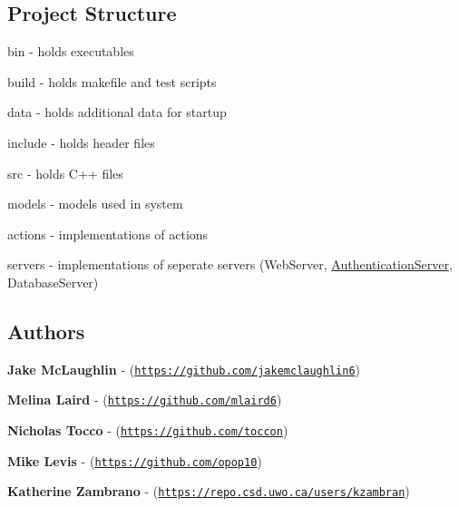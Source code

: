 \subsection*{Project Structure}


\begin{DoxyItemize}
\item {\ttfamily bin} -\/ holds executables
\item {\ttfamily build} -\/ holds makefile and test scripts
\item {\ttfamily data} -\/ holds additional data for startup
\item {\ttfamily include} -\/ holds header files
\item {\ttfamily src} -\/ holds C++ files
\begin{DoxyItemize}
\item {\ttfamily models} -\/ models used in system
\item {\ttfamily actions} -\/ implementations of actions
\item {\ttfamily servers} -\/ implementations of seperate servers (Web\+Server, \mbox{\hyperlink{class_authentication_server}{Authentication\+Server}}, Database\+Server)
\end{DoxyItemize}
\end{DoxyItemize}

\subsection*{Authors}


\begin{DoxyItemize}
\item {\bfseries Jake Mc\+Laughlin} -\/ (\href{https://github.com/jakemclaughlin6}{\tt https\+://github.\+com/jakemclaughlin6})
\item {\bfseries Melina Laird} -\/ (\href{https://github.com/mlaird6}{\tt https\+://github.\+com/mlaird6})
\item {\bfseries Nicholas Tocco} -\/ (\href{https://github.com/toccon}{\tt https\+://github.\+com/toccon})
\item {\bfseries Mike Levis} -\/ (\href{https://github.com/opop10}{\tt https\+://github.\+com/opop10})
\item {\bfseries Katherine Zambrano} -\/ (\href{https://repo.csd.uwo.ca/users/kzambran}{\tt https\+://repo.\+csd.\+uwo.\+ca/users/kzambran}) 
\end{DoxyItemize}
